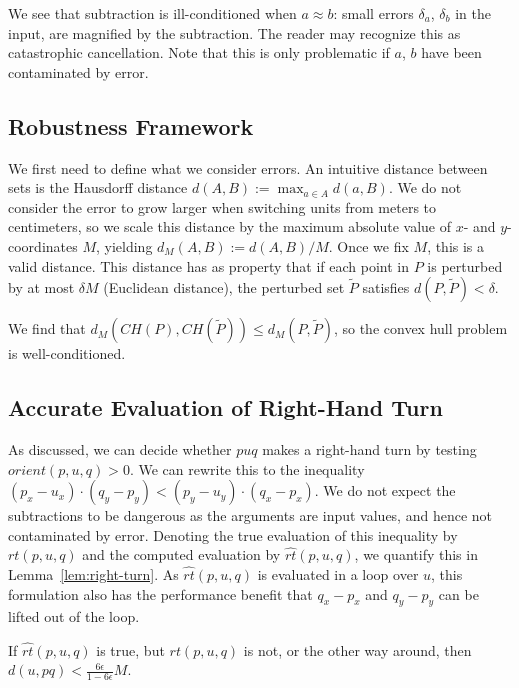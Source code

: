 We see that subtraction is ill-conditioned when $a \approx b$: small errors 
$\delta_a$, $\delta_b$ in the input, are magnified by the subtraction. The 
reader may recognize this as catastrophic cancellation. Note that this is only
problematic if $a$, $b$ have been contaminated by error.

\subsection{Robustness Framework}

We first need to define what we consider errors. An intuitive distance between
sets is the Hausdorff distance $d(A, B) := \max_{a \in A}d(a, B)$. We do not
consider the error to grow larger when switching units from meters to 
centimeters, so we scale this distance by the maximum absolute value of $x$- and
$y$-coordinates $M$, yielding $d_M(A, B) := d(A, B) / M$. Once we fix $M$, this
is a valid distance. This distance has as property that if each point in $P$
is perturbed by at most $\delta M$ (Euclidean distance), the perturbed set 
$\tilde{P}$ satisfies $d(P, \tilde{P}) < \delta$.

We find that $d_M(CH(P), CH(\tilde{P})) \leq d_M(P, \tilde{P})$, so the convex 
hull problem is well-conditioned. 

\subsection{Accurate Evaluation of Right-Hand Turn}

As discussed, we can decide whether $puq$ makes a right-hand turn by testing
$orient(p, u, q) > 0$. We can rewrite this to the inequality
$(p_x - u_x) \cdot (q_y - p_y) < (p_y - u_y) \cdot (q_x - p_x)$. 
We do not expect the subtractions to be dangerous as the arguments are input 
values, and hence not contaminated by error. Denoting the true evaluation of 
this inequality by $rt(p, u, q)$ and the computed evaluation by 
$\widehat{rt}(p, u, q)$, we quantify this in Lemma~\ref{lem:right-turn}. 
As $\widehat{rt}(p, u, q)$ is evaluated in a loop over $u$,
this formulation also has the performance benefit that 
$q_x - p_x$ and $q_y - p_y$ can be lifted out of the loop.

\begin{lemma}\label{lem:right-turn}
    If $\widehat{rt}(p, u, q)$ is true, but $rt(p, u, q)$ is not, or the
    other way around, then $d(u, pq) < \frac{6\epsilon}{1 - 6\epsilon}M$.
\end{lemma}


